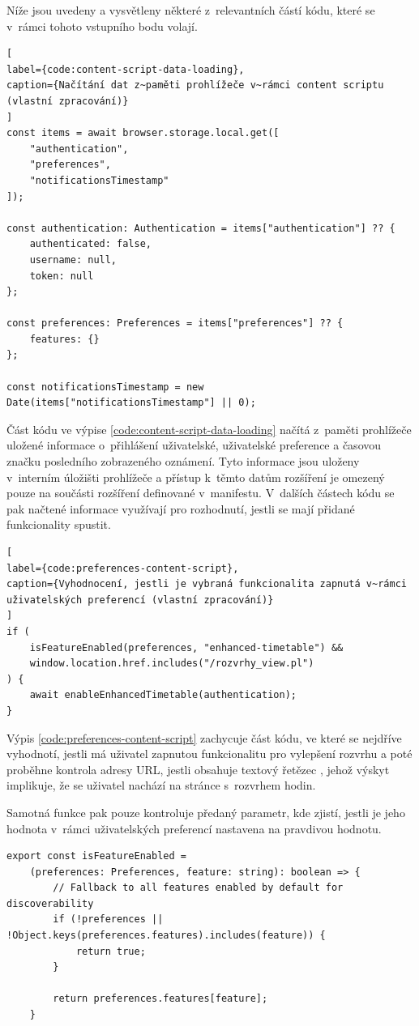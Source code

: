 Níže jsou uvedeny a vysvětleny některé z~relevantních částí kódu, které se v~rámci tohoto vstupního bodu volají.

\begin{lstlisting}[
label={code:content-script-data-loading}, 
caption={Načítání dat z~paměti prohlížeče v~rámci content scriptu (vlastní zpracování)}
]
const items = await browser.storage.local.get([
    "authentication",
    "preferences",
    "notificationsTimestamp"
]);

const authentication: Authentication = items["authentication"] ?? {
    authenticated: false,
    username: null,
    token: null
};

const preferences: Preferences = items["preferences"] ?? {
    features: {}
};

const notificationsTimestamp = new Date(items["notificationsTimestamp"] || 0);
\end{lstlisting}

 Část kódu ve výpise \ref{code:content-script-data-loading} načítá z~paměti prohlížeče uložené informace o~přihlášení uživatelské, uživatelské preference a časovou značku posledního zobrazeného oznámení. Tyto informace jsou uloženy v~interním úložišti prohlížeče a přístup k~těmto datům rozšíření je omezený pouze na součásti rozšíření definované v~manifestu.
V~dalších částech kódu se pak načtené informace využívají pro rozhodnutí, jestli se mají přidané funkcionality spustit.

\begin{lstlisting}[
label={code:preferences-content-script}, 
caption={Vyhodnocení, jestli je vybraná funkcionalita zapnutá v~rámci uživatelských preferencí (vlastní zpracování)}
]
if (
    isFeatureEnabled(preferences, "enhanced-timetable") && 
    window.location.href.includes("/rozvrhy_view.pl")
) {
    await enableEnhancedTimetable(authentication);
}
\end{lstlisting}

Výpis \ref{code:preferences-content-script} zachycuje část kódu, ve které se nejdříve vyhodnotí, jestli má uživatel zapnutou funkcionalitu pro vylepšení rozvrhu a poté proběhne kontrola adresy URL, jestli obsahuje textový řetězec , jehož výskyt implikuje, že se uživatel nachází na stránce s~rozvrhem hodin.

Samotná funkce  pak pouze kontroluje předaný parametr, kde zjistí, jestli je jeho hodnota v~rámci uživatelských preferencí nastavena na pravdivou hodnotu.

\newpage
\begin{lstlisting}[label={code:is-feature-enabled}, caption={Definice funkce \code{isFeatureEnabled} (vlastní zpracování)}]
export const isFeatureEnabled = 
    (preferences: Preferences, feature: string): boolean => {
        // Fallback to all features enabled by default for discoverability
        if (!preferences ||  !Object.keys(preferences.features).includes(feature)) {
            return true;
        }
    
        return preferences.features[feature];
    }
\end{lstlisting}

